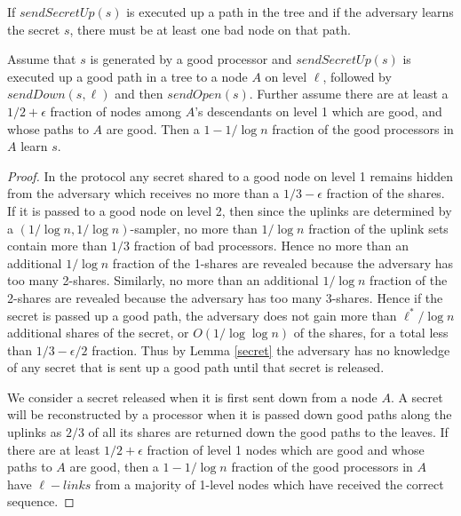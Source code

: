 \documentclass{sig-alternate}
\begin{document}
\begin{lemma}
\enumerate
\item If  $sendSecretUp(s)$ is executed up a path in the tree and if the adversary learns the secret $s$, there must be at least one bad node on that path. 
\item Assume that $s$ is generated by a good processor and $sendSecretUp(s)$ is executed up a good path in a tree to a node $A$ on level $\ell$, followed by $sendDown(s,\ell)$  and then $sendOpen(s)$.  Further assume there are at least a $1/2 + \epsilon $ fraction of nodes among $A$'s descendants on level 1 which are good, and whose paths to $A$ are good.  Then a $ 1-1/\log n$ fraction of the good processors  in $A$ learn $s$.
\end{lemma}

\begin{proof}
In the protocol any secret shared to a good node on level 1 remains hidden from the adversary which receives no more than a $1/3-\epsilon$ fraction of the shares.  If it is passed to a good node on level 2, then since the uplinks are determined by a $(1/\log n, 1/\log n)$-sampler, no more than $1/\log n$ fraction of the uplink sets contain more than $1/3$ fraction of bad processors. Hence   
no more than an additional $1/\log n$ fraction of the 1-shares are revealed because the adversary has too many 2-shares.  Similarly, no more than 
an additional $1/\log n$ fraction of the 2-shares are revealed because the adversary has too many 3-shares. Hence if the secret is passed up a good path,
the adversary does not gain more than $\ell^*/\log n$ additional shares of the secret, or $O(1/\log\log n)$ of the shares, for a total less than $1/3-\epsilon/2$ fraction. Thus by Lemma \ref{secret} the adversary has no knowledge of any secret that is sent up a good path until that secret is released. 


We consider a secret released  when it is first sent down from a node $A$. A secret will be reconstructed  by a processor when it is passed down good paths along the uplinks as  $2/3$ of all its shares are returned down the good paths to the leaves. If there are at least $1/2 +\epsilon$ fraction of level 1 nodes which are good and whose paths to $A$ are good, then a $1-1/\log n$ fraction of the good processors in $A$ have $\ell - links$ from a majority of 1-level nodes which have received the correct sequence. 
\end{proof}

\end{document}
